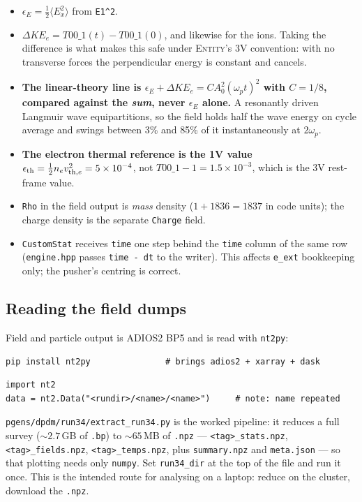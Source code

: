 \documentclass[11pt,a4paper]{article}
\newcommand{\code}[1]{\texttt{\small #1}}
\newcommand{\wpt}{\omega_p t}
\newcommand{\vthsq}{v_{{\rm th},e}^{2}}
\begin{document}
\begin{itemize}[nosep]
  \item $\epsilon_E = \tfrac12\langle E_x^2\rangle$ from \code{E1\^{}2}.
  \item $\Delta KE_e = T00\_1(t) - T00\_1(0)$, and likewise for the ions. Taking the
        difference is what makes this safe under \textsc{Entity}'s 3V convention: with
        no transverse forces the perpendicular energy is constant and cancels.
  \item \textbf{The linear-theory line is
        $\epsilon_E + \Delta KE_e = C A_0^2 (\wpt)^2$ with $C = 1/8$, compared against
        the \emph{sum}, never $\epsilon_E$ alone.} A resonantly driven Langmuir wave
        equipartitions, so the field holds half the wave energy on cycle average and
        swings between 3\% and 85\% of it instantaneously at $2\omega_p$.
  \item \textbf{The electron thermal reference is the 1V value
        $\epsilon_{\rm th} = \tfrac12 n_e \vthsq = 5\times10^{-4}$}, not
        $T00\_1 - 1 = 1.5\times10^{-3}$, which is the 3V rest-frame value.
  \item \code{Rho} in the field output is \emph{mass} density ($1 + 1836 = 1837$ in
        code units); the charge density is the separate \code{Charge} field.
  \item \code{CustomStat} receives \code{time} one step behind the \code{time} column
        of the same row (\code{engine.hpp} passes \code{time - dt} to the writer). This
        affects \code{e\_ext} bookkeeping only; the pusher's centring is correct.
\end{itemize}

\subsection{Reading the field dumps}

Field and particle output is ADIOS2 BP5 and is read with \code{nt2py}:

\begin{lstlisting}
pip install nt2py               # brings adios2 + xarray + dask
\end{lstlisting}
\begin{lstlisting}
import nt2
data = nt2.Data("<rundir>/<name>/<name>")     # note: name repeated
\end{lstlisting}

\code{pgens/dpdm/run34/extract\_run34.py} is the worked pipeline: it reduces a full
survey (${\sim}2.7$\,GB of \code{.bp}) to ${\sim}65$\,MB of \code{.npz}
--- \code{<tag>\_stats.npz}, \code{<tag>\_fields.npz}, \code{<tag>\_temps.npz},
plus \code{summary.npz} and \code{meta.json} --- so that plotting needs only
\code{numpy}. Set \code{run34\_dir} at the top of the file and run it once. This is the
intended route for analysing on a laptop: reduce on the cluster, download the
\code{.npz}.
\end{document}
